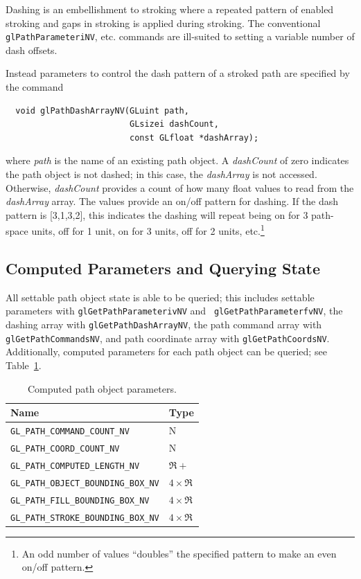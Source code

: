 Dashing is an embellishment to stroking where a repeated pattern of
enabled stroking and gaps in stroking is applied during stroking.
The conventional {\tt glPathParameteriNV}, etc. commands are ill-suited to
setting a variable number of dash offsets.

Instead parameters to control the dash pattern of a stroked path are
specified by the command
\begin{lstlisting}
  void glPathDashArrayNV(GLuint path,
                         GLsizei dashCount,
                         const GLfloat *dashArray);
\end{lstlisting}
where {\em path} is the name of an existing path object.  A {\em
dashCount} of zero indicates the path object is not dashed; in this case,
the {\em dashArray} is not accessed.  Otherwise, {\em dashCount} provides
a count of how many float values to read from the {\em dashArray} array.
The values provide an on/off pattern for dashing.  If the dash pattern is [3,1,3,2],
this indicates the dashing will repeat being on for 3 path-space units, off for 1
unit, on for 3 units, off for 2 units, etc.\footnote{An odd number of values ``doubles''
the specified pattern to make an even on/off pattern.}

\subsection{Computed Parameters and Querying State}

All settable path object state is able to be queried; this
includes settable parameters with {\tt glGetPathParameterivNV} and {\tt
glGetPathParameterfvNV}, the dashing array with {\tt glGetPathDashArrayNV},
the path command array with {\tt glGetPathCommandsNV}, and path coordinate
array with {\tt glGetPathCoordsNV}.  Additionally, computed parameters for
each path object can be queried; see Table~\ref{tab:computed}.
\begin{table}[htb]
\begin{center}
{\small
\begin{tabular}{|l|l|}
\hline
{\bf Name} & {\bf Type} \\
\hline
\hline
{\tt GL\_PATH\_COMMAND\_COUNT\_NV} & N \\
{\tt GL\_PATH\_COORD\_COUNT\_NV} & N \\
\hline
{\tt GL\_PATH\_COMPUTED\_LENGTH\_NV} & $\Re+$ \\
\hline
{\tt GL\_PATH\_OBJECT\_BOUNDING\_BOX\_NV} & $4\times\Re$ \\
{\tt GL\_PATH\_FILL\_BOUNDING\_BOX\_NV} & $4\times\Re$ \\
{\tt GL\_PATH\_STROKE\_BOUNDING\_BOX\_NV} & $4\times\Re$ \\
\hline
\end{tabular}
}
\end{center}
\caption{Computed path object parameters.}
\label{tab:computed}
\end{table}

